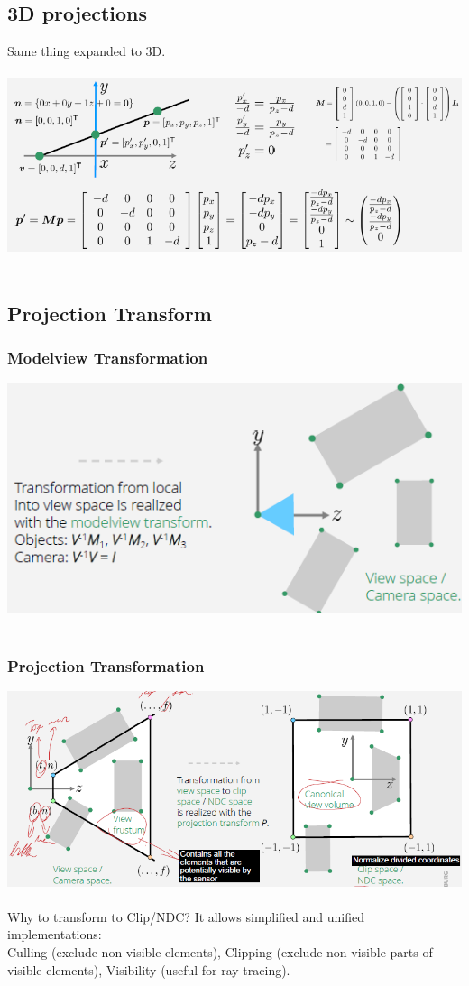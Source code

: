 \documentclass{article}
\begin{document}
\subsection{3D projections}
Same thing expanded to 3D.\\\\
\includegraphics[scale=0.6]{image38.png}\\\\
\subsection{Projection Transform}
\subsubsection{Modelview Transformation}
\includegraphics[scale=0.6]{image39.png}\\\\
\subsubsection{Projection Transformation}
\includegraphics[scale=0.6]{image40.png}\\\\
Why to transform to Clip/NDC? It allows simplified and unified implementations:\\
Culling (exclude non-visible elements), Clipping (exclude non-visible parts of visible elements), Visibility (useful for ray tracing).\\
\end{document}
